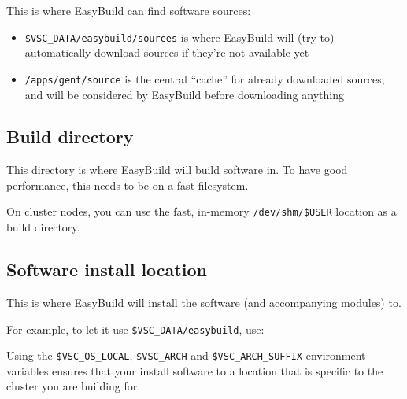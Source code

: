 This is where EasyBuild can find software sources:

\begin{prompt}
\end{prompt}

\begin{itemize}
    \item \lstinline|$VSC_DATA/easybuild/sources| is where EasyBuild will (try to) automatically
        download sources if they're not available yet
    \item \lstinline|/apps/gent/source| is the central ``cache'' for already downloaded sources,
        and will be considered by EasyBuild before downloading anything
\end{itemize}




\subsection{Build directory}

This directory is where EasyBuild will build software in. To have good performance,
this needs to be on a fast filesystem.

\begin{prompt}
\end{prompt}

On cluster nodes, you can use the fast, in-memory \lstinline|/dev/shm/$USER| location
as a build directory.

\subsection{Software install location}

This is where EasyBuild will install the software (and accompanying modules) to.

For example, to let it use \lstinline|$VSC_DATA/easybuild|, use:



\begin{prompt}
\end{prompt}

Using the \lstinline|$VSC_OS_LOCAL|, \lstinline|$VSC_ARCH| and \lstinline|$VSC_ARCH_SUFFIX| environment variables
ensures that your install software to a location that is specific to the cluster you are
building for.

